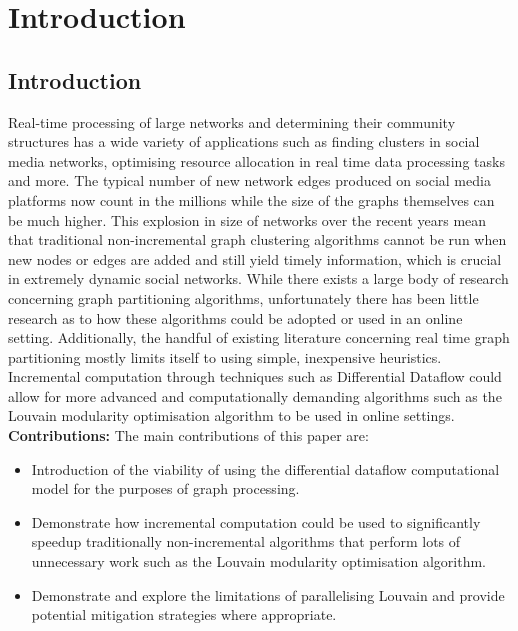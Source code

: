 


\chapter{Introduction}

\section{Introduction}
Real-time processing of large networks and determining their community structures has a wide variety of applications such as finding clusters in social media networks, optimising resource allocation in real time data processing tasks and more. The typical number of new network edges produced on social media platforms now count in the millions while the size of the graphs themselves can be much higher. This explosion in size of networks over the recent years mean that traditional non-incremental graph clustering algorithms cannot be run when new nodes or edges are added and still yield timely information, which is crucial in extremely dynamic social networks. While there exists a large body of research concerning graph partitioning algorithms, unfortunately there has been little research as to how these algorithms could be adopted or used in an online setting. Additionally, the handful of existing literature concerning real time graph partitioning mostly limits itself to using simple, inexpensive heuristics. Incremental computation through techniques such as Differential Dataflow \cite{mcsherry2013differential} could allow for more advanced and computationally demanding algorithms such as the Louvain \cite{blondel2008fast} modularity optimisation algorithm to be used in online settings.\\
\textbf{Contributions:} The main contributions of this paper are:
\begin{itemize}
    \item Introduction of the viability of using the differential dataflow computational model for the purposes of graph processing. 
    \item Demonstrate how incremental computation could be used to significantly speedup traditionally non-incremental algorithms that perform lots of unnecessary work such as the Louvain modularity optimisation algorithm. 
    \item Demonstrate and explore the limitations of parallelising Louvain and provide potential mitigation strategies where appropriate. 
\end{itemize}


